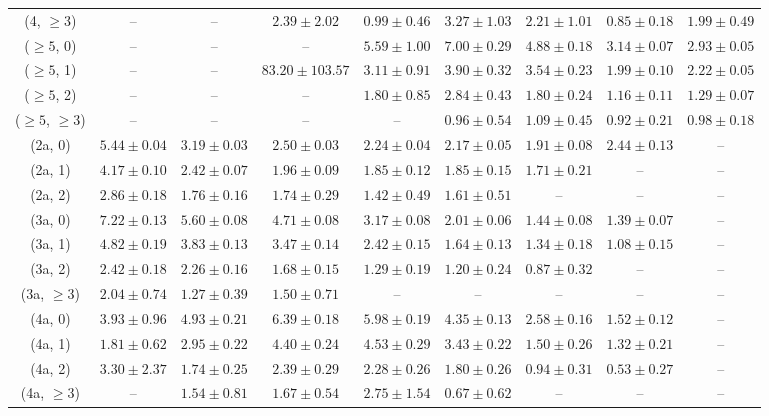 \begin{table}[h!]
{\begin{tabular}{ccccccccc}
	(4, $\ge3$) & -- & -- & $2.39\pm 2.02$ & $0.99\pm 0.46$ & $3.27\pm 1.03$ & $2.21\pm 1.01$ & $0.85\pm 0.18$ & $1.99\pm 0.49$ \\[0.5ex] 
	($\ge5$, 0) & -- & -- & -- & $5.59\pm 1.00$ & $7.00\pm 0.29$ & $4.88\pm 0.18$ & $3.14\pm 0.07$ & $2.93\pm 0.05$ \\[0.5ex] 
	($\ge5$, 1) & -- & -- & $83.20\pm 103.57$ & $3.11\pm 0.91$ & $3.90\pm 0.32$ & $3.54\pm 0.23$ & $1.99\pm 0.10$ & $2.22\pm 0.05$ \\[0.5ex] 
	($\ge5$, 2) & -- & -- & -- & $1.80\pm 0.85$ & $2.84\pm 0.43$ & $1.80\pm 0.24$ & $1.16\pm 0.11$ & $1.29\pm 0.07$ \\[0.5ex] 
	($\ge5$, $\ge3$) & -- & -- & -- & -- & $0.96\pm 0.54$ & $1.09\pm 0.45$ & $0.92\pm 0.21$ & $0.98\pm 0.18$ \\[0.5ex] 
	(2a, 0) & $5.44\pm 0.04$ & $3.19\pm 0.03$ & $2.50\pm 0.03$ & $2.24\pm 0.04$ & $2.17\pm 0.05$ & $1.91\pm 0.08$ & $2.44\pm 0.13$ & -- \\[0.5ex] 
	(2a, 1) & $4.17\pm 0.10$ & $2.42\pm 0.07$ & $1.96\pm 0.09$ & $1.85\pm 0.12$ & $1.85\pm 0.15$ & $1.71\pm 0.21$ & -- & -- \\[0.5ex] 
	(2a, 2) & $2.86\pm 0.18$ & $1.76\pm 0.16$ & $1.74\pm 0.29$ & $1.42\pm 0.49$ & $1.61\pm 0.51$ & -- & -- & -- \\[0.5ex] 
	(3a, 0) & $7.22\pm 0.13$ & $5.60\pm 0.08$ & $4.71\pm 0.08$ & $3.17\pm 0.08$ & $2.01\pm 0.06$ & $1.44\pm 0.08$ & $1.39\pm 0.07$ & -- \\[0.5ex] 
	(3a, 1) & $4.82\pm 0.19$ & $3.83\pm 0.13$ & $3.47\pm 0.14$ & $2.42\pm 0.15$ & $1.64\pm 0.13$ & $1.34\pm 0.18$ & $1.08\pm 0.15$ & -- \\[0.5ex] 
	(3a, 2) & $2.42\pm 0.18$ & $2.26\pm 0.16$ & $1.68\pm 0.15$ & $1.29\pm 0.19$ & $1.20\pm 0.24$ & $0.87\pm 0.32$ & -- & -- \\[0.5ex] 
	(3a, $\ge3$) & $2.04\pm 0.74$ & $1.27\pm 0.39$ & $1.50\pm 0.71$ & -- & -- & -- & -- & -- \\[0.5ex] 
	(4a, 0) & $3.93\pm 0.96$ & $4.93\pm 0.21$ & $6.39\pm 0.18$ & $5.98\pm 0.19$ & $4.35\pm 0.13$ & $2.58\pm 0.16$ & $1.52\pm 0.12$ & -- \\[0.5ex] 
	(4a, 1) & $1.81\pm 0.62$ & $2.95\pm 0.22$ & $4.40\pm 0.24$ & $4.53\pm 0.29$ & $3.43\pm 0.22$ & $1.50\pm 0.26$ & $1.32\pm 0.21$ & -- \\[0.5ex] 
	(4a, 2) & $3.30\pm 2.37$ & $1.74\pm 0.25$ & $2.39\pm 0.29$ & $2.28\pm 0.26$ & $1.80\pm 0.26$ & $0.94\pm 0.31$ & $0.53\pm 0.27$ & -- \\[0.5ex] 
	(4a, $\ge3$) & -- & $1.54\pm 0.81$ & $1.67\pm 0.54$ & $2.75\pm 1.54$ & $0.67\pm 0.62$ & -- & -- & -- \\[0.5ex] 

\end{tabular}}
\end{table}
